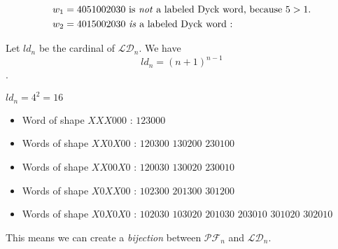 \begin{example}[$n = 5$]
    \begin{align*}
        &w_1 = 4051002030 \text{ is \emph{not} a labeled
            Dyck word, because }5 > 1.\\
        &w_2 = 4015002030 \text{ \emph{is} a labeled
            Dyck word :}\\
    \end{align*}
    
\end{example}

\begin{theorem}
    Let $ld_n$ be the cardinal of $\mathcal{LD}_n$.
    We have $$ld_n = (n + 1)^{n - 1}$$.
\end{theorem}

\begin{example}[$n = 3$]
    $ld_n = 4^2 = 16$
    \begin{itemize}
        \item Word of shape $XXX000$ :
            \subitem $123000$
        \item Words of shape $XX0X00$ :
            \subitem $120300$
            \hspace{2cm} $130200$
            \hspace{2cm} $230100$
        \item Words of shape $XX00X0$ :
            \subitem $120030$
            \hspace{2cm} $130020$
            \hspace{2cm} $230010$
        \item Words of shape $X0XX00$ :
            \subitem $102300$
            \hspace{2cm} $201300$
            \hspace{2cm} $301200$
        \item Words of shape $X0X0X0$ :
            \subitem $102030$
            \hspace{2cm} $103020$
            \hspace{2cm} $201030$
            \subitem $203010$
            \hspace{2cm} $301020$
            \hspace{2cm} $302010$
    \end{itemize}
    
\end{example}

\begin{prop}
    This means we can create a \emph{bijection} between
    $\mathcal{PF}_n$ and $\mathcal{LD}_n$.
\end{prop}

